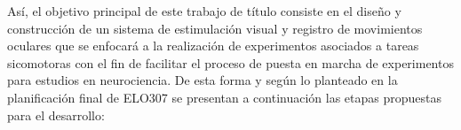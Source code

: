 \documentclass[../main.tex]{subfiles}
\begin{document}
		Así, el objetivo principal de este trabajo de título consiste en el diseño y construcción de un sistema de estimulación visual y registro de movimientos oculares que se enfocará a la realización de experimentos asociados a tareas sicomotoras con el fin de facilitar el proceso de puesta en marcha de experimentos para estudios en neurociencia. De esta forma y según lo planteado en la planificación final de ELO307 se presentan a continuación las etapas propuestas para el desarrollo: 
		
\end{document}
